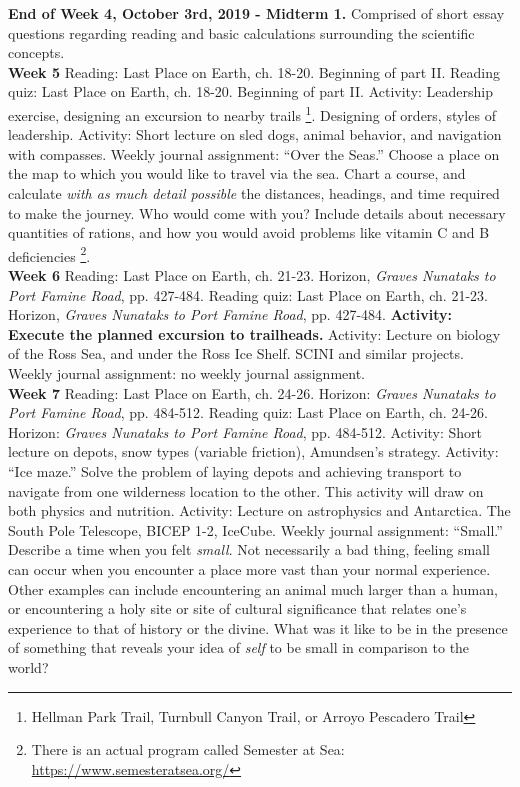 \documentclass[10pt]{article}
\begin{document}
\begin{outline}[enumerate]
\1 \textbf{End of Week 4, October 3rd, 2019 - Midterm 1.} Comprised of short essay questions regarding reading and basic calculations surrounding the scientific concepts. \\
\clearpage
\1 \textbf{Week 5}
\2 Reading: Last Place on Earth, ch. 18-20. Beginning of part II.
\2 Reading quiz: Last Place on Earth, ch. 18-20. Beginning of part II.
\2 Activity: Leadership exercise, designing an excursion to nearby trails \footnote{Hellman Park Trail, Turnbull Canyon Trail, or Arroyo Pescadero Trail}. Designing of orders, styles of leadership.
\2 Activity: Short lecture on sled dogs, animal behavior, and navigation with compasses.
\2 Weekly journal assignment: ``Over the Seas.''  Choose a place on the map to which you would like to travel via the sea.  Chart a course, and calculate \textit{with as much detail possible} the distances, headings, and time required to make the journey.  Who would come with you?  Include details about necessary quantities of rations, and how you would avoid problems like vitamin C and B deficiencies \footnote{There is an actual program called Semester at Sea: \url{https://www.semesteratsea.org/}}. \\
\1 \textbf{Week 6}
\2 Reading: Last Place on Earth, ch. 21-23. Horizon, \textit{Graves Nunataks to Port Famine Road}, pp. 427-484.
\2 Reading quiz: Last Place on Earth, ch. 21-23. Horizon, \textit{Graves Nunataks to Port Famine Road}, pp. 427-484.
\2 \textbf{Activity: Execute the planned excursion to trailheads.}
\2 Activity: Lecture on biology of the Ross Sea, and under the Ross Ice Shelf. SCINI and similar projects.
\2 Weekly journal assignment: no weekly journal assignment. \\
\1 \textbf{Week 7}
\2 Reading: Last Place on Earth, ch. 24-26. Horizon: \textit{Graves Nunataks to Port Famine Road}, pp. 484-512.
\2 Reading quiz: Last Place on Earth, ch. 24-26. Horizon: \textit{Graves Nunataks to Port Famine Road}, pp. 484-512.
\2 Activity: Short lecture on depots, snow types (variable friction), Amundsen's strategy.
\2 Activity: ``Ice maze.''  Solve the problem of laying depots and achieving transport to navigate from one wilderness location to the other.  This activity will draw on both physics and nutrition.
\2 Activity: Lecture on astrophysics and Antarctica.  The South Pole Telescope, BICEP 1-2, IceCube.
\2 Weekly journal assignment: ``Small.'' Describe a time when you felt \textit{small}.  Not necessarily a bad thing, feeling small can occur when you encounter a place more vast than your normal experience.  Other examples can include encountering an animal much larger than a human, or encountering a holy site or site of cultural significance that relates one's experience to that of history or the divine.  What was it like to be in the presence of something that reveals your idea of \textit{self} to be small in comparison to the world? \\

\end{outline}
\end{document}
